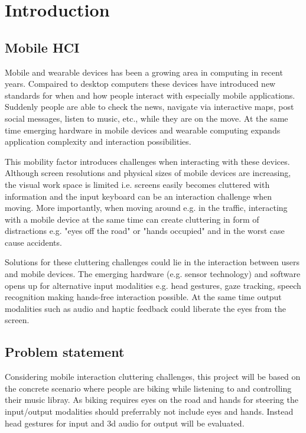 \chapter{Introduction}
\section{Mobile HCI}
Mobile and wearable devices has been a growing area in computing in recent years. Compaired to desktop computers these devices have introduced new standards for when and how people interact with especially mobile applications. Suddenly people are able to check the news, navigate via interactive maps, post social messages, listen to music, etc., while they are on the move. At the same time emerging hardware in mobile devices and wearable computing expands application complexity and interaction possibilities.

This mobility factor introduces challenges when interacting with these devices. Although screen resolutions and physical sizes of mobile devices are increasing, the visual work space is limited i.e. screens easily becomes cluttered with information and the input keyboard can be an interaction challenge when moving. More importantly, when moving around e.g. in the traffic, interacting with a mobile device at the same time can create cluttering in form of distractions e.g. "eyes off the road" or "hands occupied" and in the worst case cause accidents.

Solutions for these cluttering challenges could lie in the interaction between users and mobile devices. The emerging hardware (e.g. sensor technology) and software opens up for alternative input modalities e.g. head gestures, gaze tracking, speech recognition making hands-free interaction possible. At the same time output modalities such as audio and haptic feedback could liberate the eyes from the screen.

\section{Problem statement}
Considering mobile interaction cluttering challenges, this project will be based on the concrete scenario where people are biking while listening to and controlling their music libray. As biking requires eyes on the road and hands for steering the input/output modalities should preferrably not include eyes and hands. Instead head gestures for input and 3d audio for output will be evaluated.


